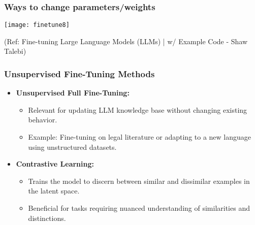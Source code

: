 


\begin{frame}[fragile]\frametitle{Ways to change parameters/weights}


		\begin{center}
		\texttt{[image: finetune8]}
		\end{center}

{\tiny (Ref: Fine-tuning Large Language Models (LLMs) | w/ Example Code - Shaw Talebi)}

\end{frame}



\begin{frame}[fragile]\frametitle{Unsupervised Fine-Tuning Methods}

\begin{itemize}
\item \textbf{Unsupervised Full Fine-Tuning:}
  \begin{itemize}
	\item Relevant for updating LLM knowledge base without changing existing behavior.
	\item Example: Fine-tuning on legal literature or adapting to a new language using unstructured datasets.
  \end{itemize}
\item \textbf{Contrastive Learning:}
  \begin{itemize}
	\item Trains the model to discern between similar and dissimilar examples in the latent space.
	\item Beneficial for tasks requiring nuanced understanding of similarities and distinctions.
  \end{itemize}
\end{itemize}
\end{frame}

